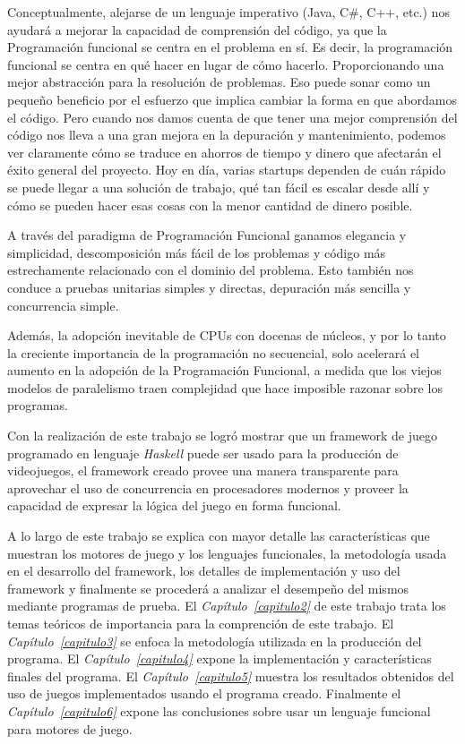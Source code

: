 Conceptualmente, alejarse de un lenguaje imperativo (Java, C\#, C++, etc.) nos ayudará a mejorar la capacidad de comprensión del código, ya que la Programación funcional se centra en el problema en sí. Es decir, la programación funcional se centra en qué hacer en lugar de cómo hacerlo. Proporcionando una mejor abstracción para la resolución de problemas. Eso puede sonar como un pequeño beneficio por el esfuerzo que implica cambiar la forma en que abordamos el código. Pero cuando nos damos cuenta de que tener una mejor comprensión del código nos lleva a una gran mejora en la depuración y mantenimiento, podemos ver claramente cómo se traduce en ahorros de tiempo y dinero que afectarán el éxito general del proyecto. Hoy en día, varias startups dependen de cuán rápido se puede llegar a una solución de trabajo, qué tan fácil es escalar desde allí y cómo se pueden hacer esas cosas con la menor cantidad de dinero posible.

A través del paradigma de Programación Funcional ganamos elegancia y simplicidad, descomposición más fácil de los problemas y código más estrechamente relacionado con el dominio del problema. Esto también nos conduce a pruebas unitarias simples y directas, depuración más sencilla y concurrencia simple.

Además, la adopción inevitable de CPUs con docenas de núcleos, y por lo tanto la creciente importancia de la programación no secuencial, solo acelerará el aumento en la adopción de la Programación Funcional, a medida que los viejos modelos de paralelismo traen complejidad que hace imposible razonar sobre los programas.

Con la realización de este trabajo se logró mostrar que un framework de juego programado en lenguaje \emph{Haskell} puede ser usado para la producción de videojuegos, el framework creado provee una manera transparente para aprovechar el uso de concurrencia en procesadores modernos y proveer la capacidad de expresar la lógica del juego en forma funcional.

A lo largo de este trabajo se explica con mayor detalle las características que muestran los motores de juego y los lenguajes funcionales, la metodología usada en el desarrollo del framework, los detalles de implementación y uso del framework y finalmente se procederá a analizar el desempeño del mismos mediante programas de prueba. El \emph{Capítulo~\ref{capitulo2}} de este trabajo trata los temas teóricos de importancia para la comprención de este trabajo. El \emph{Capítulo~\ref{capitulo3}} se enfoca la metodología utilizada en la producción del programa. El \emph{Capítulo~\ref{capitulo4}} expone la implementación y características finales del programa. El \emph{Capítulo~\ref{capitulo5}} muestra los resultados obtenidos del uso de juegos implementados usando el programa creado. Finalmente el \emph{Capítulo~\ref{capitulo6}} expone las conclusiones sobre usar un lenguaje funcional para motores de juego.
